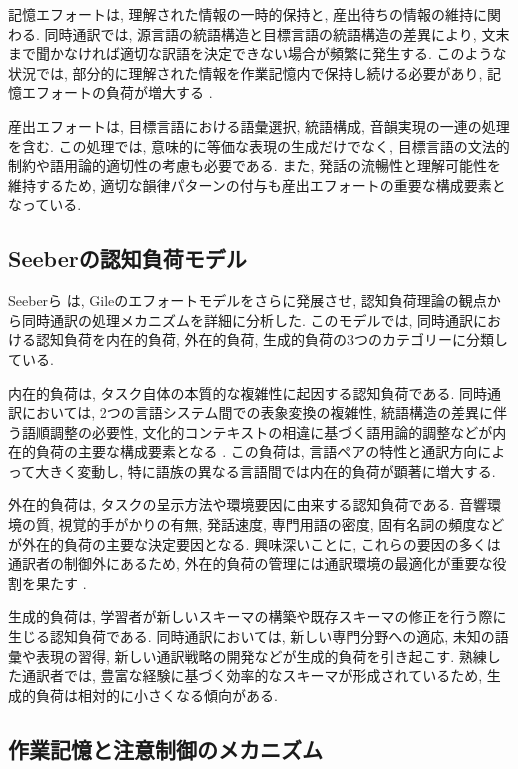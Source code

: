 記憶エフォートは, 理解された情報の一時的保持と, 産出待ちの情報の維持に関わる.
同時通訳では, 源言語の統語構造と目標言語の統語構造の差異により, 文末まで聞かなければ適切な訳語を決定できない場合が頻繁に発生する.
このような状況では, 部分的に理解された情報を作業記憶内で保持し続ける必要があり, 記憶エフォートの負荷が増大する \cite{daro1994memory}.

産出エフォートは, 目標言語における語彙選択, 統語構成, 音韻実現の一連の処理を含む.
この処理では, 意味的に等価な表現の生成だけでなく, 目標言語の文法的制約や語用論的適切性の考慮も必要である.
また, 発話の流暢性と理解可能性を維持するため, 適切な韻律パターンの付与も産出エフォートの重要な構成要素となっている.

\subsection{Seeberの認知負荷モデル}

Seeberら \cite{seeber2011cognitive, seeber2013cognitive} は, Gileのエフォートモデルをさらに発展させ, 認知負荷理論の観点から同時通訳の処理メカニズムを詳細に分析した.
このモデルでは, 同時通訳における認知負荷を内在的負荷, 外在的負荷, 生成的負荷の3つのカテゴリーに分類している.

内在的負荷は, タスク自体の本質的な複雑性に起因する認知負荷である.
同時通訳においては, 2つの言語システム間での表象変換の複雑性, 統語構造の差異に伴う語順調整の必要性, 文化的コンテキストの相違に基づく語用論的調整などが内在的負荷の主要な構成要素となる \cite{seeber2011cognitive}.
この負荷は, 言語ペアの特性と通訳方向によって大きく変動し, 特に語族の異なる言語間では内在的負荷が顕著に増大する.

外在的負荷は, タスクの呈示方法や環境要因に由来する認知負荷である.
音響環境の質, 視覚的手がかりの有無, 発話速度, 専門用語の密度, 固有名詞の頻度などが外在的負荷の主要な決定要因となる.
興味深いことに, これらの要因の多くは通訳者の制御外にあるため, 外在的負荷の管理には通訳環境の最適化が重要な役割を果たす \cite{kurz2001conference}.

生成的負荷は, 学習者が新しいスキーマの構築や既存スキーマの修正を行う際に生じる認知負荷である.
同時通訳においては, 新しい専門分野への適応, 未知の語彙や表現の習得, 新しい通訳戦略の開発などが生成的負荷を引き起こす.
熟練した通訳者では, 豊富な経験に基づく効率的なスキーマが形成されているため, 生成的負荷は相対的に小さくなる傾向がある.

\subsection{作業記憶と注意制御のメカニズム}

